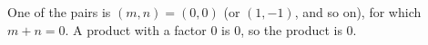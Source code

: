 One of the pairs is $(m,n)=(0,0)$ (or $(1,-1)$, and so on), for which $m+n=0$. A product with a factor $0$ is $0$, so the product is $\boxed{0}$.
